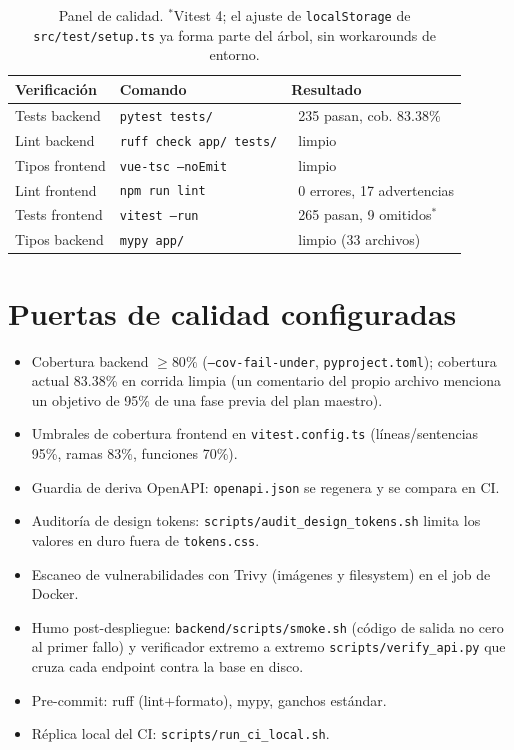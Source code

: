 \documentclass[11pt,letterpaper,twoside]{report}
\newcommand{\ok}{\textcolor{cenidim-vino}{\textbf{\checkmark}}}
\newcommand{\codigo}[1]{\texttt{#1}}
\begin{document}
\begin{table}[h]
  \centering
  \begin{tabular}{lll}
    \toprule
    \textbf{Verificación} & \textbf{Comando} & \textbf{Resultado} \\
    \midrule
    Tests backend   & \codigo{pytest tests/}        & \ok\ 235 pasan, cob. 83.38\% \\
    Lint backend    & \codigo{ruff check app/ tests/} & \ok\ limpio \\
    Tipos frontend  & \codigo{vue-tsc --noEmit}      & \ok\ limpio \\
    Lint frontend   & \codigo{npm run lint}          & \ok\ 0 errores, 17 advertencias \\
    Tests frontend  & \codigo{vitest --run}          & \ok\ 265 pasan, 9 omitidos$^{\ast}$ \\
    Tipos backend   & \codigo{mypy app/}             & \ok\ limpio (33 archivos) \\
    \bottomrule
  \end{tabular}
  \caption{Panel de calidad. $^{\ast}$Vitest 4; el ajuste de
    \codigo{localStorage} de \codigo{src/test/setup.ts} ya forma parte
    del árbol, sin workarounds de entorno.}
  \label{tab:calidad}
\end{table}

\section{Puertas de calidad configuradas}
\begin{itemize}
  \item Cobertura backend $\ge 80\%$ (\codigo{--cov-fail-under},
        \codigo{pyproject.toml}); cobertura actual 83.38\% en corrida
        limpia (un comentario del propio archivo menciona un objetivo
        de 95\% de una fase previa del plan maestro).
  \item Umbrales de cobertura frontend en \codigo{vitest.config.ts}
        (líneas/sentencias 95\%, ramas 83\%, funciones 70\%).
  \item Guardia de deriva OpenAPI: \codigo{openapi.json} se regenera y
        se compara en CI.
  \item Auditoría de design tokens:
        \codigo{scripts/audit_design_tokens.sh} limita los valores en
        duro fuera de \codigo{tokens.css}.
  \item Escaneo de vulnerabilidades con Trivy (imágenes y filesystem)
        en el job de Docker.
  \item Humo post-despliegue:
        \codigo{backend/scripts/smoke.sh} (código de salida no
        cero al primer fallo) y verificador extremo a extremo
        \codigo{scripts/verify_api.py} que cruza cada endpoint contra
        la base en disco.
  \item Pre-commit: ruff (lint+formato), mypy, ganchos estándar.
  \item Réplica local del CI: \codigo{scripts/run_ci_local.sh}.
\end{itemize}
\end{document}
